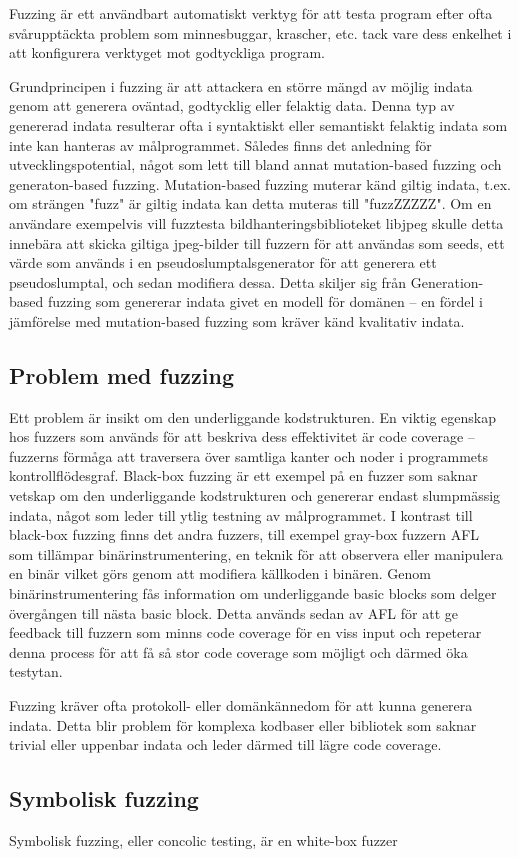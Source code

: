 Fuzzing är ett användbart automatiskt verktyg för att testa program efter
ofta svårupptäckta problem som minnesbuggar, krascher, etc. tack vare dess
enkelhet i att konfigurera verktyget mot godtyckliga program.  

Grundprincipen i fuzzing är att attackera en större mängd av möjlig indata genom
att generera oväntad, godtycklig eller felaktig data. Denna typ av genererad
indata resulterar ofta i syntaktiskt eller semantiskt felaktig indata som inte
kan hanteras av målprogrammet. Således finns det anledning för
utvecklingspotential, något som lett till bland annat mutation-based fuzzing och
generaton-based fuzzing. Mutation-based fuzzing muterar känd giltig indata,
t.ex. om strängen "fuzz" är giltig indata kan detta muteras till "fuzzZZZZZ". Om
en användare exempelvis vill fuzztesta bildhanteringsbiblioteket libjpeg skulle
detta innebära att skicka giltiga jpeg-bilder till fuzzern för att användas som
seeds, ett värde som används i en pseudoslumptalsgenerator för att generera ett
pseudoslumptal, och sedan modifiera dessa. Detta skiljer sig från
Generation-based fuzzing som genererar indata givet en modell för domänen -- en
fördel i jämförelse med mutation-based fuzzing som kräver känd kvalitativ
indata. 

\subsection{Problem med fuzzing}
Ett problem är insikt om den underliggande kodstrukturen. En
viktig egenskap hos fuzzers som används för att beskriva dess effektivitet är
code coverage -- fuzzerns förmåga att traversera över samtliga kanter och noder i programmets
kontrollflödesgraf. Black-box fuzzing är ett exempel på en fuzzer
som saknar vetskap om den underliggande kodstrukturen och genererar
endast slumpmässig indata, något som leder till ytlig testning av målprogrammet.
I kontrast till black-box fuzzing finns det andra fuzzers, till exempel gray-box
fuzzern AFL~\cite{aflplusplus} som tillämpar binärinstrumentering, en teknik för att observera
eller manipulera en binär vilket görs genom att modifiera källkoden i binären.
Genom binärinstrumentering fås information om underliggande basic blocks som
delger övergången till nästa basic block. Detta används sedan av AFL för att ge
feedback till fuzzern som minns code coverage för en viss input och repeterar
denna process för att få så stor code coverage som möjligt och därmed öka
testytan.

Fuzzing kräver ofta protokoll- eller domänkännedom för att kunna generera
indata. Detta blir problem för komplexa kodbaser eller bibliotek som saknar
trivial eller uppenbar indata och leder därmed till lägre code coverage. 


\subsection{Symbolisk fuzzing}
Symbolisk fuzzing, eller concolic testing, är en white-box fuzzer




